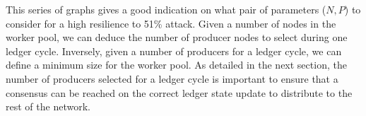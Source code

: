 This series of graphs gives a good indication on what pair of parameters ($N,P$) to consider for a high resilience to 51\% attack. Given a number of nodes in the worker pool, we can deduce the number of producer nodes to select during one ledger cycle. Inversely, given a number of producers for a ledger cycle, we can define a minimum size for the worker pool. As detailed in the next section, the number of producers selected for a ledger cycle is important to ensure that a consensus can be reached on the correct ledger state update to distribute to the rest of the network.

